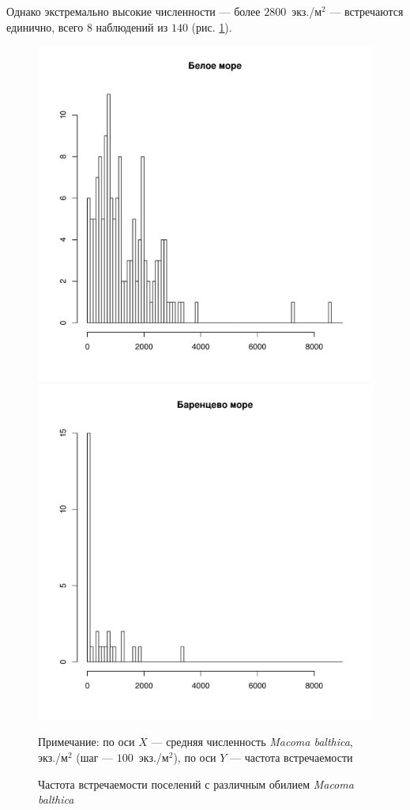 %
Однако экстремально высокие численности --- более $2800$~экз./м$^2$ --- встречаются единично, всего $8$ наблюдений из $140$ (рис. \ref{ris:Nmean_hist}).
%
	\begin{figure}[p]
		\includegraphics[height=.3\textheight]{../All_N/Nmean_hist_White1.pdf}
		\includegraphics[height=.3\textheight]{../All_N/Nmean_hist_Barents1.pdf}
	\caption{Частота встречаемости поселений с различным обилием {\it Macoma balthica}}
	{\footnotesize Примечание: по оси $X$ --- средняя численность {\it Macoma balthica}, экз./м$^2$ (шаг --- $100$~экз./м$^2$), по оси $Y$ 	--- частота встречаемости}
	\label{ris:Nmean_hist}
	\end{figure}
